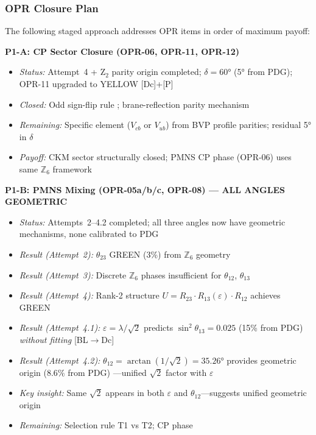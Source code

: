 \subsubsection{OPR Closure Plan}

\begin{tcolorbox}[colback=blue!5, colframe=blue!60!black,
    title=\textbf{OPR Closure Plan: Prioritized Research Program}]
The following staged approach addresses OPR items in order of maximum payoff:

\textbf{P1-A: CP Sector Closure (OPR-06, OPR-11, OPR-12)}
\begin{itemize}[nosep]
    \item \emph{Status:} Attempt~4 + Z$_2$ parity origin completed; $\delta = 60°$ (5° from PDG); OPR-11 upgraded to YELLOW [Dc]+[P]
    \item \emph{Closed:} Odd sign-flip rule \tagDc{}; brane-reflection parity mechanism \tagP{}
    \item \emph{Remaining:} Specific element ($V_{cb}$ or $V_{ub}$) from BVP profile parities; residual 5° in $\delta$
    \item \emph{Payoff:} CKM sector structurally closed; PMNS CP phase (OPR-06) uses same $\mathbb{Z}_6$ framework
\end{itemize}

\textbf{P1-B: PMNS Mixing (OPR-05a/b/c, OPR-08) --- ALL ANGLES GEOMETRIC}
\begin{itemize}[nosep]
    \item \emph{Status:} Attempts~2--4.2 completed; all three angles now have geometric mechanisms, none calibrated to PDG
    \item \emph{Result (Attempt~2):} $\theta_{23}$ GREEN (3\%) from $\mathbb{Z}_6$ geometry \tagDc{}
    \item \emph{Result (Attempt~3):} Discrete $\mathbb{Z}_6$ phases insufficient for $\theta_{12}$, $\theta_{13}$
    \item \emph{Result (Attempt~4):} Rank-2 structure $U = R_{23} \cdot R_{13}(\varepsilon) \cdot R_{12}$ achieves GREEN
    \item \emph{Result (Attempt~4.1):} $\varepsilon = \lambda/\sqrt{2}$ predicts $\sin^2\theta_{13} = 0.025$ (15\% from PDG) \emph{without fitting} [BL$\to$Dc]
    \item \emph{Result (Attempt~4.2):} $\theta_{12} = \arctan(1/\sqrt{2}) = 35.26°$ provides geometric origin ($8.6\%$ from PDG) \tagDc{}---unified $\sqrt{2}$ factor with $\varepsilon$
    \item \emph{Key insight:} Same $\sqrt{2}$ appears in both $\varepsilon$ and $\theta_{12}$---suggests unified geometric origin
    \item \emph{Remaining:} Selection rule T1 vs T2; CP phase
\end{itemize}
\noindent{}


\end{tcolorbox}
